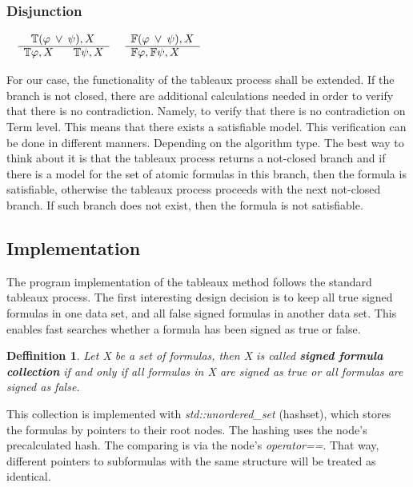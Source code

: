 \documentclass{article}
\newtheorem{defn}[theorem]{Deffinition}
\begin{document}
		\subsubsection*{Disjunction}
			$\begin{array}{rl}
				& \:\:\: \mathbb{T}(\varphi \: \vee \: \psi), X \\
			      \cline{2-2}
			      & \mathbb{T}\varphi, X \:\:\:\:\:\:\:\: \mathbb{T}\psi, X
			\end{array}$
			\:\:\:\:\:\:\:\:\:\:\:\:\:\:\:\:\:\:\:\:\:\:\:\:\:\:\:\:\:\:\:\:
			$\begin{array}{rl}
				& \mathbb{F}(\varphi \: \vee \: \psi), X \\
			      \cline{2-2}
			      & \mathbb{F}\varphi, \mathbb{F}\psi, X
			\end{array}$

	\newpage
	For our case, the functionality of the tableaux process shall be extended. If the branch is not closed, there are additional calculations needed in order to verify that there is no contradiction. Namely, to verify that there is no contradiction on Term level. This means that there exists a satisfiable model.
	This verification can be done in different manners. Depending on the algorithm type. The best way to think about it is that the tableaux process returns a not-closed branch and if there is a model for the set of atomic formulas in this branch, then the formula is satisfiable, otherwise the tableaux process proceeds with the next not-closed branch. If such branch does not exist, then the formula is not satisfiable. 

	\subsection{Implementation}
	The program implementation of the tableaux method follows the standard tableaux process. The first interesting design decision is to keep all true signed formulas in one data set, and all false signed formulas in another data set. This enables fast searches whether a formula has been signed as true or false.

	\begin{defn}
	Let X be a set of formulas, then X is called \textbf{signed formula collection} if and only if all formulas in X are signed as true or all formulas are signed as false.
	\end{defn}

	This collection is implemented with \textit{std::unordered\_set} (hashset), which stores the formulas by pointers to their root nodes. The hashing uses the node's precalculated hash. The comparing is via the node's \textit{operator==}. That way, different pointers to subformulas with the same structure will be treated as identical.
\end{document}
